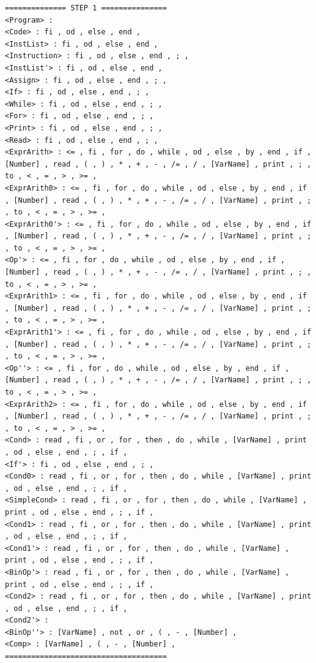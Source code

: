\documentclass[pdftex,10pt,a4paper]{article}
\begin{document}
\begin{lstlisting}[breaklines]
============== STEP 1 ===============
<Program> : 
<Code> : fi , od , else , end , 
<InstList> : fi , od , else , end , 
<Instruction> : fi , od , else , end , ; , 
<InstList'> : fi , od , else , end , 
<Assign> : fi , od , else , end , ; , 
<If> : fi , od , else , end , ; , 
<While> : fi , od , else , end , ; , 
<For> : fi , od , else , end , ; , 
<Print> : fi , od , else , end , ; , 
<Read> : fi , od , else , end , ; , 
<ExprArith> : <= , fi , for , do , while , od , else , by , end , if , [Number] , read , ( , ) , * , + , - , /= , / , [VarName] , print , ; , to , < , = , > , >= , 
<ExprArith0> : <= , fi , for , do , while , od , else , by , end , if , [Number] , read , ( , ) , * , + , - , /= , / , [VarName] , print , ; , to , < , = , > , >= , 
<ExprArith0'> : <= , fi , for , do , while , od , else , by , end , if , [Number] , read , ( , ) , * , + , - , /= , / , [VarName] , print , ; , to , < , = , > , >= , 
<Op'> : <= , fi , for , do , while , od , else , by , end , if , [Number] , read , ( , ) , * , + , - , /= , / , [VarName] , print , ; , to , < , = , > , >= , 
<ExprArith1> : <= , fi , for , do , while , od , else , by , end , if , [Number] , read , ( , ) , * , + , - , /= , / , [VarName] , print , ; , to , < , = , > , >= , 
<ExprArith1'> : <= , fi , for , do , while , od , else , by , end , if , [Number] , read , ( , ) , * , + , - , /= , / , [VarName] , print , ; , to , < , = , > , >= , 
<Op''> : <= , fi , for , do , while , od , else , by , end , if , [Number] , read , ( , ) , * , + , - , /= , / , [VarName] , print , ; , to , < , = , > , >= , 
<ExprArith2> : <= , fi , for , do , while , od , else , by , end , if , [Number] , read , ( , ) , * , + , - , /= , / , [VarName] , print , ; , to , < , = , > , >= , 
<Cond> : read , fi , or , for , then , do , while , [VarName] , print , od , else , end , ; , if , 
<If'> : fi , od , else , end , ; , 
<Cond0> : read , fi , or , for , then , do , while , [VarName] , print , od , else , end , ; , if , 
<SimpleCond> : read , fi , or , for , then , do , while , [VarName] , print , od , else , end , ; , if , 
<Cond1> : read , fi , or , for , then , do , while , [VarName] , print , od , else , end , ; , if , 
<Cond1'> : read , fi , or , for , then , do , while , [VarName] , print , od , else , end , ; , if , 
<BinOp'> : read , fi , or , for , then , do , while , [VarName] , print , od , else , end , ; , if , 
<Cond2> : read , fi , or , for , then , do , while , [VarName] , print , od , else , end , ; , if , 
<Cond2'> : 
<BinOp''> : [VarName] , not , or , ( , - , [Number] , 
<Comp> : [VarName] , ( , - , [Number] , 
=====================================


\end{lstlisting}
\end{document}
